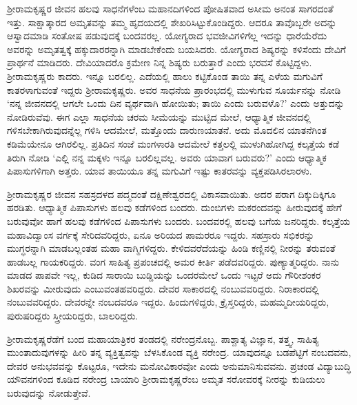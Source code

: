 ಶ‍್ರೀರಾಮಕೃಷ್ಣರ ಜೀವನ ಹಲವು ಸಾಧನೆಗಳೆಂಬ ಮಹಾನದಿಗಳಿಂದ ಪೋಷಿತವಾದ ಅಸೀಮ ಅನಂತ ಸಾಗರದಂತೆ ಇತ್ತು. ಸಾಕ್ಷಾತ್ಕಾರದ ಅಮೃತವನ್ನು ತಮ್ಮ ಹೃದಯದಲ್ಲಿ ಶೇಖರಿಸಿಟ್ಟುಕೊಂಡಿದ್ದರು. ಆದರೂ ತಾವೊಬ್ಬರೇ ಅದನ್ನು ಆಸ್ವಾದಮಾಡಿ ಸಂತೋಷ ಪಡುವುದಕ್ಕೆ ಬಂದವರಲ್ಲ. ಯೋಗ್ಯರಾದ ಭವಜೀವಿಗಳಿಗೆಲ್ಲ ಇದನ್ನು ಧಾರೆಯೆರೆದು ಅವರನ್ನು ಅಮೃತತ್ವಕ್ಕೆ ಹಕ್ಕುದಾರರನ್ನಾಗಿ ಮಾಡಬೇಕೆಂದು ಬಯಸಿದರು. ಯೋಗ್ಯರಾದ ಶಿಷ್ಯರನ್ನು ಕಳಿಸೆಂದು ದೇವಿಗೆ ಪ್ರಾರ್ಥನೆ ಮಾಡಿದರು. ದೇವಿಯಾದರೊ ಕ್ರಮೇಣ ನಿನ್ನ ಶಿಷ್ಯರು ಬರುತ್ತಾರೆ ಎಂದು ಭರವಸೆ ಕೊಟ್ಟಿದ್ದಳು. ಶ‍್ರೀರಾಮಕೃಷ್ಣರು ಕಾದರು. ಇನ್ನೂ ಬರಲಿಲ್ಲ. ಎದೆಯಲ್ಲಿ ಹಾಲು ಕಟ್ಟಿಕೊಂಡ ತಾಯಿ ತನ್ನ ಎಳೆಯ ಮಗುವಿಗೆ ಕಾತರಳಾಗುವಂತೆ ಇದ್ದರು ಶ‍್ರೀರಾಮಕೃಷ್ಣರು. ಅವರ ಸಾಧನೆಯ ಪ್ರಾರಂಭದಲ್ಲಿ ಮುಳುಗುವ ಸೂರ್ಯನನ್ನು ನೋಡಿ ‘ನನ್ನ ಜೀವನದಲ್ಲಿ ಆಗಲೇ ಒಂದು ದಿನ ವ್ಯರ್ಥವಾಗಿ ಹೋಯಿತು; ತಾಯಿ ಎಂದು ಬರುವಳೊ?’ ಎಂದು ಅತ್ತುದನ್ನು ನೋಡಿರುವೆವು. ಈಗ ಎಲ್ಲಾ ಸಾಧನೆಯ ಚರಮ ಸೀಮೆಯನ್ನು ಮುಟ್ಟಿದ ಮೇಲೆ, ಆಧ್ಯಾತ್ಮಿಕ ಜೀವನದಲ್ಲಿ ಗಳಿಸಬೇಕಾಗಿರುವುದನ್ನೆಲ್ಲ ಗಳಿಸಿ ಆದಮೇಲೆ, ಮತ್ತೊಂದು ದಾರುಣಯಾತನೆ. ಅದು ಮೊದಲಿನ ಯಾತನೆಗಿಂತ ಕಡಿಮೆಯೇನೂ ಆಗಿರಲಿಲ್ಲ. ಪ್ರತಿದಿನ ಸಂಜೆ ಮಂಗಳಾರತಿ ಆದಮೇಲೆ ಕತ್ತಲಲ್ಲಿ ಮುಳುಗಿಹೋಗಿದ್ದ ಕಲ್ಕತ್ತೆಯ ಕಡೆ ತಿರುಗಿ ನೋಡಿ ‘ಎಲ್ಲಿ ನನ್ನ ಮಕ್ಕಳು ಇನ್ನೂ ಬರಲಿಲ್ಲವಲ್ಲ. ಅವರು ಯಾವಾಗ ಬರುವರು?’ ಎಂದು ಆಧ್ಯಾತ್ಮಿಕ ಪಿಪಾಸುಗಳಿಗಾಗಿ ಅತ್ತರು. ಯಾವ ತಾಯಿಯೂ ತನ್ನ ಮಗುವಿಗೆ ಇಷ್ಟು ಕಾತರವನ್ನು ವ್ಯಕ್ತಪಡಿಸಿರಲಾರಳು.

ಶ‍್ರೀರಾಮಕೃಷ್ಣರ ಜೀವನ ಸಹಸ್ರದಳದ ಪದ್ಮದಂತೆ ದಕ್ಷಿಣೇಶ್ವರದಲ್ಲಿ ವಿಕಾಸವಾಯಿತು. ಅದರ ಪರಾಗ ದಿಕ್ಕುದಿಕ್ಕಿಗೂ ಹರಡಿತು. ಆಧ್ಯಾತ್ಮಿಕ ಪಿಪಾಸುಗಳು ಹಲವು ಕಡೆಗಳಿಂದ ಬಂದರು. ದುಂಬಿಗಳು ಮಕರಂದವನ್ನು ಹೀರುವುದಕ್ಕೆ ಹೇಗೆ ಬರುವುವೋ ಹಾಗೆ ಹಲವು ಕಡೆಗಳಿಂದ ಪಿಪಾಸುಗಳು ಬಂದರು. ಬಂದವರಲ್ಲಿ ಹಲವು ಬಗೆಯ ಜನರಿದ್ದರು. ಕಲ್ಕತ್ತೆಯ ಮಹಾವಿದ್ವಾಂಸ ವರ್ಗಕ್ಕೆ ಸೇರಿದವರಿದ್ದರು, ಏನೂ ಅರಿಯದ ಪಾಮರರೂ ಇದ್ದರು. ಸಹಸ್ರಾರು ಸಭಿಕರನ್ನು ಮುಗ್ಧರನ್ನಾಗಿ ಮಾಡಬಲ್ಲಂತಹ ಮಹಾ ವಾಗ್ಮಿಗಳಿದ್ದರು. ಕೇಳಿದವರೆದೆಯನ್ನು ಹಿಂಡಿ ಕಣ್ಣಿನಲ್ಲಿ ನೀರನ್ನು ತರುವಂತೆ ಹಾಡಬಲ್ಲ ಗಾಯಕರಿದ್ದರು. ವಂಗ ಸಾಹಿತ್ಯ ಪ್ರಪಂಚದಲ್ಲಿ ಅಮರ ಕೀರ್ತಿ ಪಡೆದವರಿದ್ದರು. ಪುಣ್ಯಾತ್ಮರಿದ್ದರು. ನಾನು ಮಾಡದ ಪಾಪವೇ ಇಲ್ಲ, ಕುಡಿದ ಸಾರಾಯಿ ಬುಡ್ಡಿಯನ್ನು ಒಂದರಮೇಲೆ ಒಂದು ಇಟ್ಟರೆ ಅದು ಗೌರೀಶಂಕರ ಶಿಖರವನ್ನು ಮೀರುವುದು ಎಂಬುವಂತಹವರಿದ್ದರು. ದೇವರ ಸಾಕಾರದಲ್ಲಿ ನಂಬುವವರಿದ್ದರು. ನಿರಾಕಾರದಲ್ಲಿ ನಂಬುವವರಿದ್ದರು. ದೇವರನ್ನೇ ನಂಬದವರೂ ಇದ್ದರು. ಹಿಂದುಗಳಿದ್ದರು, ಕ್ರೈಸ್ತರಿದ್ದರು, ಮಹಮ್ಮದೀಯರಿದ್ದರು, ಪುರುಷರಿದ್ದರು ಸ್ತ್ರೀಯರಿದ್ದರು, ಬಾಲರಿದ್ದರು.

ಶ‍್ರೀರಾಮಕೃಷ್ಣರೆಡೆಗೆ ಬಂದ ಮಹಾಯಾತ್ರಿಕರ ತಂಡದಲ್ಲಿ ನರೇಂದ್ರನೊಬ್ಬ. ಪಾಶ್ಚಾತ್ಯ ವಿಜ್ಞಾನ, ತತ್ತ್ವ, ಸಾಹಿತ್ಯ ಮುಂತಾದುವುಗಳನ್ನು ಹೀರಿ ತನ್ನ ವ್ಯಕ್ತಿತ್ವವನ್ನು ಬೆಳಸಿಕೊಂಡ ವ್ಯಕ್ತಿ ನರೇಂದ್ರ. ಯಾವುದನ್ನೂ ಬಡಪೆಟ್ಟಿಗೆ ನಂಬದವನು, ದೇವರ ಅನುಭವವನ್ನು ಕೊಟ್ಟರೂ, ಇದೇನು ಮನೋವಿಕಾರವೋ ಎಂದು ಅನುಮಾನಿಸುವವನು. ಪ್ರಚಂಡ ವಿದ್ಯಾಬುದ್ಧಿ ಯೌವನಗಳಿಂದ ಕೂಡಿದ ನರೇಂದ್ರ ಬಾಯಾರಿ ಶ‍್ರೀರಾಮಕೃಷ್ಣರೆಂಬ ಅಮೃತ ಸರೋವರಕ್ಕೆ ನೀರನ್ನು ಕುಡಿಯಲು ಬರುವುದನ್ನು ನೋಡುತ್ತೇವೆ.

